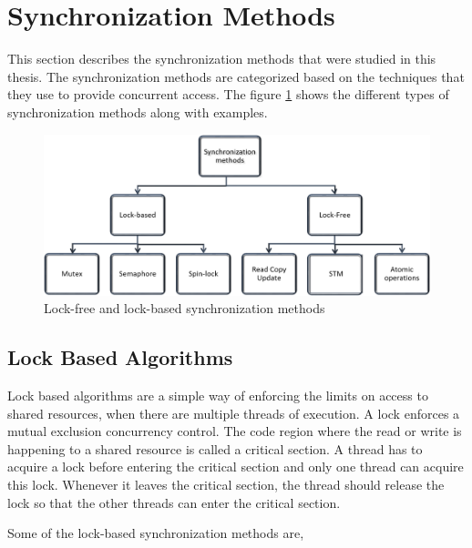 \section{Synchronization Methods} \label{rq:sync}
This section describes the synchronization methods that were studied in this thesis. The synchronization methods are categorized based on the techniques that they use to provide concurrent access. The figure \ref{fig:sync} shows the different types of synchronization methods along with examples. 
\begin{figure}[h]
\centering
\includegraphics[width=0.9\linewidth]{figures/sync}
\caption{Lock-free and lock-based synchronization methods}
\label{fig:sync}
\end{figure}


\subsection{Lock Based Algorithms}
Lock based algorithms are a simple way of enforcing the limits on access to shared resources, when there are multiple threads of execution. A lock enforces a mutual exclusion concurrency control. The code region where the read or write is happening to a shared resource is called a critical section. A thread has to acquire a lock before entering the critical section and only one thread can acquire this lock. Whenever it leaves the critical section, the thread should release the lock so that the other threads can enter the critical section.

Some of the lock-based synchronization methods are,


